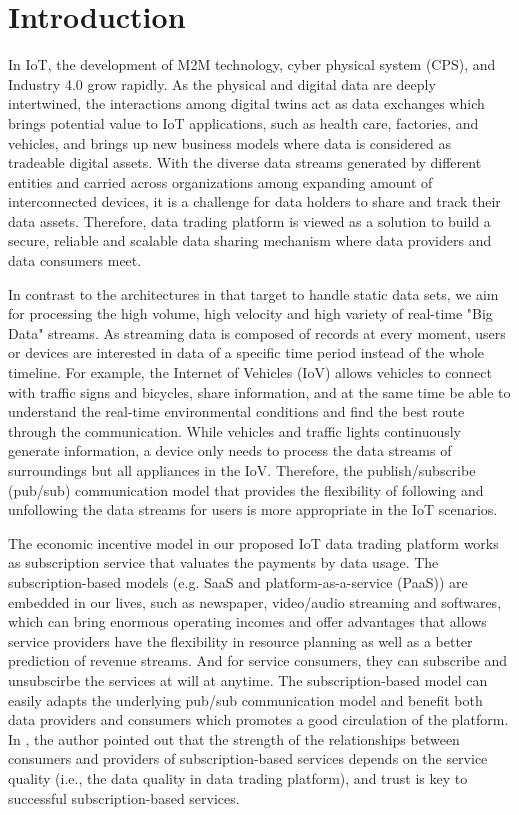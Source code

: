 \documentclass[conference]{IEEEtran}
\begin{document}
\section{Introduction}
In IoT, the development of M2M technology\cite{M2M}, cyber physical system (CPS)\cite{CPS}, and Industry 4.0 grow rapidly. As the physical and digital data are deeply intertwined, the interactions among digital twins act as data exchanges\cite{digitaltwin} which brings potential value to IoT applications, such as health care\cite{healthCare}, factories, and vehicles\cite{AutonomousDriving}, and brings up new business models where data is considered as tradeable digital assets. With the diverse data streams generated by different entities and carried across organizations among expanding amount of interconnected devices, it is a challenge for data holders to share and track their data assets. Therefore, data trading platform is viewed as a solution to build a secure, reliable and scalable data sharing mechanism where data providers and data consumers meet.

In contrast to the architectures in \cite{DIaas, MARSA} that target to handle static data sets, we aim for processing the high volume, high velocity and high variety of real-time "Big Data" streams\cite{BigData}. As streaming data is composed of records at every moment, users or devices are interested in data of a specific time period instead of the whole timeline. For example, the Internet of Vehicles (IoV) allows vehicles to connect with traffic signs and bicycles, share information, and at the same time be able to understand the real-time environmental conditions and find the best route through the communication. While vehicles and traffic lights continuously generate information, a device only needs to process the data streams of surroundings but all appliances in the IoV. Therefore, the publish/subscribe (pub/sub) communication model that provides the flexibility of following and unfollowing the data streams for users is more appropriate in the IoT scenarios.

The economic incentive model in our proposed IoT data trading platform works as subscription service that valuates the payments by data usage. The subscription-based models (e.g. SaaS and platform-as-a-service (PaaS)) are embedded in our lives, such as newspaper, video/audio streaming and softwares, which can bring enormous operating incomes and offer advantages that allows service providers have the flexibility in resource planning as well as a better prediction of revenue streams. And for service consumers, they can subscribe and unsubscirbe the services at will at anytime. The subscription-based model can easily adapts the underlying pub/sub communication model and benefit both data providers and consumers which promotes a good circulation of the platform. In \cite{SaaS}, the author pointed out that the strength of the relationships between consumers and providers of subscription-based services depends on the service quality (i.e., the data quality in data trading platform), and trust is key to successful subscription-based services.
\end{document}
